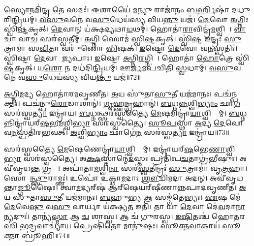 \ul{𑌸𑍍𑌯𑍋}𑌨𑌮𑌿॑𑌨𑍍𑌦𑍍𑌰 \ul{𑌤𑍇} 𑌸𑌦𑌃॑।
\ul{𑌈}𑌶𑌾𑌯𑍈॑ \ul{𑌮}𑌨𑍍𑌯𑍁 𑌰𑌾𑌜𑌾॑𑌨𑌂 \ul{𑌬}\ul{𑌰𑍍}𑌹𑌿𑌷𑌾॑ 𑌦𑌧𑍁𑌰𑌿\ul{𑌨𑍍𑌦𑍍𑌰𑌿}𑌯𑌮𑍍।
\ul{𑌵}\ul{𑌸𑍁}𑌵𑌨𑍇॑ 𑌵\ul{𑌸𑍁}𑌧𑍇𑌯॑𑌸𑍍𑌯 𑌵𑌿𑌯\ul{𑌨𑍍𑌤𑍁} 𑌯𑌜॑।
\ul{𑌦𑍇}𑌵𑍋 \ul{𑌅}𑌗𑍍𑌨𑌿𑌃 𑌸𑍍𑌵𑌿॑\ul{𑌷𑍍𑌟}𑌕𑍃𑌤𑍍।
\ul{𑌦𑍇}𑌵𑌾𑌨𑍍 𑌯॑𑌕𑍍𑌷𑌦𑍍𑌯𑌥𑌾\ul{𑌯}𑌥𑌮𑍍।
𑌹𑍋𑌤𑌾॑\ul{𑌰𑌾}𑌵𑌿𑌨𑍍𑌦𑍍𑌰॑\ul{𑌮}𑌶𑍍𑌵𑌿𑌨𑌾᳚।
\ul{𑌵𑌾}𑌚𑌾 𑌵𑌾\ul{𑌚}\ul{} 𑌸𑌰॑𑌸𑍍𑌵𑌤𑍀𑌮𑍍।
\ul{𑌅}𑌗𑍍𑌨𑌿 𑌸𑍋𑌮॑ 𑌸𑍍𑌵𑌿\ul{𑌷𑍍𑌟}𑌕𑍃𑌤𑍍।
𑌸𑍍𑌵𑌿॑\ul{𑌷𑍍𑌟} 𑌇𑌨𑍍𑌦𑍍𑌰𑌃॑ \ul{𑌸𑍁}𑌤𑍍𑌰𑌾𑌮𑌾॑ 𑌸\ul{𑌵𑌿}𑌤𑌾 𑌵𑌰𑍁॑𑌣𑍋 \ul{𑌭𑌿}𑌷𑌕𑍍।
\ul{𑌇}𑌷𑍍𑌟𑍋 \ul{𑌦𑍇}𑌵𑍋 𑌵\ul{𑌨}𑌸𑍍𑌪𑌤𑌿𑌃॑।
𑌸𑍍𑌵𑌿॑𑌷𑍍𑌟𑌾 \ul{𑌦𑍇}𑌵𑌾 𑌆᳚\ul{𑌜𑍍𑌯}𑌪𑌾𑌃।
\ul{𑌇}𑌷𑍍𑌟𑍋 \ul{𑌅}𑌗𑍍𑌨𑌿\ul{𑌰}𑌗𑍍𑌨𑌿𑌨𑌾᳚।
𑌹𑍋𑌤𑌾॑ \ul{𑌹𑍋}𑌤𑍍𑌰𑍇 𑌸𑍍𑌵𑌿॑\ul{𑌷𑍍𑌟}𑌕𑍃𑌤𑍍।
𑌯\ul{𑌶𑍋} 𑌨 𑌦𑌧॑𑌦𑌿\ul{𑌨𑍍𑌦𑍍𑌰𑌿}𑌯𑌮𑍍।
𑌊\ul{𑌰𑍍𑌜}𑌮𑌪॑𑌚𑌿𑌤𑌿 \ul{𑌸𑍍𑌵}𑌧𑌾𑌮𑍍।
\ul{𑌵}\ul{𑌸𑍁}𑌵𑌨𑍇॑ 𑌵\ul{𑌸𑍁}𑌧𑍇𑌯॑𑌸𑍍𑌯 𑌵𑌿𑌯\ul{𑌨𑍍𑌤𑍁} 𑌯𑌜॑॥72॥

\ul{𑌅}𑌗𑍍𑌨𑌿\ul{𑌮}𑌦𑍍𑌯 𑌹𑍋𑌤𑌾॑𑌰𑌮𑌵𑍃𑌣𑍀𑌤।
\ul{𑌅}𑌯 𑌸𑍁॑𑌤𑌾\ul{𑌸𑍁}𑌤𑍀 𑌯𑌜॑𑌮𑌾𑌨𑌃।
𑌪𑌚॑\ul{𑌨𑍍𑌪}𑌕𑍍𑌤𑍀𑌃।
𑌪𑌚॑𑌨𑍍𑌪𑍁\ul{𑌰𑍋}𑌡𑌾𑌶𑌾𑌨𑍍॑।
\ul{𑌗𑍃}𑌹𑍍𑌣𑌨𑍍𑌗𑍍𑌰𑌹𑌾𑌨𑍍॑।
\ul{𑌬}𑌧𑍍𑌨\ul{𑌨𑍍𑌨}𑌶𑍍𑌵𑌿\ul{𑌭𑍍𑌯𑌾𑌂} 𑌛𑌾\ul{𑌗}\ul{} 𑌸𑌰॑𑌸𑍍𑌵\ul{𑌤𑍍𑌯𑌾} 𑌇𑌨𑍍𑌦𑍍𑌰𑌾॑𑌯।
\ul{𑌬}𑌧𑍍𑌨𑌨𑍍𑌥𑍍𑌸𑌰॑𑌸𑍍𑌵𑌤𑍍𑌯𑍈 \ul{𑌮𑍇}𑌷𑌮𑌿𑌨𑍍𑌦𑍍𑌰𑌾॑\ul{𑌯𑌾}𑌶𑍍𑌵𑌿\-𑌭𑍍𑌯𑌾᳚𑌮𑍍।
\ul{𑌬}𑌧𑍍𑌨𑌨𑍍𑌨𑌿𑌨𑍍𑌦𑍍𑌰𑌾॑𑌯𑌰𑍍‌\mbox{}\ul{𑌷}𑌭\ul{𑌮}𑌶𑍍𑌵𑌿\ul{𑌭𑍍𑌯𑌾}\ul{} 𑌸𑌰॑𑌸𑍍𑌵𑌤𑍍𑌯𑍈।
\ul{𑌸𑍂}\ul{𑌪}𑌸𑍍𑌥𑌾 \ul{𑌅}𑌦𑍍𑌯 \ul{𑌦𑍇}𑌵𑍋 𑌵\ul{𑌨}𑌸𑍍𑌪𑌤𑌿॑𑌰𑌭𑌵𑌤𑍍।
\ul{𑌅}𑌶𑍍𑌵𑌿\ul{𑌭𑍍𑌯𑌾𑌂} 𑌛𑌾𑌗𑍇॑\ul{𑌨} 𑌸𑌰॑𑌸𑍍𑌵\ul{𑌤𑍍𑌯𑌾} 𑌇𑌨𑍍𑌦𑍍𑌰𑌾॑𑌯॥73॥

𑌸𑌰॑𑌸𑍍𑌵𑌤𑍍𑌯𑍈 \ul{𑌮𑍇}𑌷𑍇𑌣𑍇𑌨𑍍𑌦𑍍𑌰𑌾॑\ul{𑌯𑌾}𑌶𑍍𑌵𑌿𑌭𑍍𑌯𑌾᳚𑌮𑍍।
𑌇𑌨𑍍𑌦𑍍𑌰𑌾॑𑌯𑌰𑍍‌\mbox{}\ul{𑌷}𑌭𑍇\ul{𑌣𑌾}𑌶𑍍𑌵𑌿\ul{𑌭𑍍𑌯𑌾}\ul{} 𑌸𑌰॑𑌸𑍍𑌵𑌤𑍍𑌯𑍈।
𑌅\ul{𑌕𑍍𑌷}\ul{}𑌸𑍍𑌤𑌾𑌨𑍍𑌮𑍇॑\ul{𑌦}𑌸𑍍𑌤𑌃 𑌪𑍍𑌰𑌤𑌿॑\-𑌪\ul{𑌚}𑌤𑌾𑌗𑍍𑌰॑𑌭𑍀𑌷𑍁𑌃।
𑌅𑌵𑍀॑𑌵𑍃𑌧\ul{𑌨𑍍𑌤} 𑌗𑍍𑌰𑌹𑍈𑌃᳚।
𑌅𑌪𑌾॑𑌤𑌾\ul{𑌮}𑌶𑍍𑌵𑌿\ul{𑌨𑌾} 𑌸𑌰॑\ul{𑌸𑍍𑌵}𑌤𑍀𑌨𑍍𑌦𑍍𑌰𑌃॑ \ul{𑌸𑍁}𑌤𑍍𑌰𑌾𑌮𑌾॑ 𑌵𑍃\ul{𑌤𑍍𑌰}𑌹𑌾।
𑌸𑍋𑌮𑌾᳚\ul{𑌨𑍍𑌥𑍍𑌸𑍁}𑌰𑌾𑌮𑍍𑌣𑌃॑।
𑌉𑌪𑍋॑ 𑌉𑌕𑍍𑌥𑌾\ul{𑌮}𑌦𑌾𑌃 \ul{𑌶𑍍𑌰𑍗}𑌦𑍍𑌵𑌿𑌮𑌦𑌾॑ 𑌅𑌦𑌨𑍍।
𑌅𑌵𑍀॑𑌵𑍃𑌧𑌨𑍍𑌤𑌾\ul{𑌙𑍍𑌗𑍂}𑌷𑍈𑌃।
𑌤𑍍𑌵𑌾\ul{𑌮}𑌦𑍍𑌯𑌰𑍍‌\mbox{}𑌷॑ 𑌆𑌰𑍍‌\mbox{}𑌷𑍇𑌯𑌰𑍍‌\mbox{}𑌷𑍀𑌣𑌾𑌨𑍍𑌨𑌪𑌾𑌦𑌵𑍃𑌣𑍀𑌤।
\ul{𑌅}𑌯 𑌸𑍁॑𑌤𑌾\ul{𑌸𑍁}𑌤𑍀 𑌯𑌜॑𑌮𑌾𑌨𑌃।
\ul{𑌬}𑌹𑍁\ul{𑌭𑍍𑌯} 𑌆 𑌸𑌙𑍍𑌗॑𑌤𑍇𑌭𑍍𑌯𑌃।
\ul{𑌏}𑌷 𑌮𑍇॑ \ul{𑌦𑍇}𑌵𑍇\ul{𑌷𑍁} 𑌵\ul{𑌸𑍁} 𑌵𑌾𑌰𑍍𑌯𑌾 𑌯॑𑌕𑍍𑌷𑍍𑌯\ul{𑌤} 𑌇𑌤𑌿॑।
𑌤𑌾 𑌯𑌾 \ul{𑌦𑍇}𑌵𑌾 𑌦𑍇॑\ul{𑌵}𑌦𑌾\ul{𑌨𑌾}𑌨𑍍𑌯𑌦𑍁𑌃॑।
𑌤𑌾𑌨𑍍𑌯॑\ul{𑌸𑍍𑌮𑌾} 𑌆 \ul{𑌚} 𑌶𑌾𑌸𑍍𑌵॑।
𑌆 𑌚॑ 𑌗𑍁𑌰𑌸𑍍𑌵।
\ul{𑌇}\ul{𑌷𑌿}𑌤𑌶𑍍𑌚॑ 𑌹𑍋\ul{𑌤}𑌰𑌸𑌿॑ 𑌭\ul{𑌦𑍍𑌰}𑌵𑌾𑌚𑍍𑌯𑌾॑\ul{𑌯} 𑌪𑍍𑌰𑍇𑌷𑌿॑\ul{𑌤𑍋} 𑌮𑌾𑌨𑍁॑𑌷𑌃।
\ul{𑌸𑍂}\ul{𑌕𑍍𑌤}\ul{𑌵𑌾}𑌕𑌾𑌯॑ \ul{𑌸𑍂}𑌕𑍍𑌤𑌾 𑌬𑍍𑌰𑍂॑𑌹𑌿॥74॥\anuvakamend[𑌇𑌨𑍍𑌦𑍍𑌰𑌾॑\ul{𑌯} 𑌯𑌜॑𑌮𑌾𑌨𑌃 \ul{𑌸}𑌪𑍍𑌤 𑌚॑]

